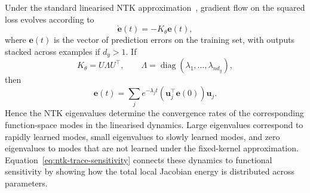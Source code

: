 \documentclass{article}
\theoremstyle{definition}
\theoremstyle{remark}
\begin{document}
Under the standard linearised NTK approximation~\cite{Jacot_2018, lee2019wide, chizat2019lazy}, gradient flow on the squared loss evolves according to
\begin{equation}
    \dot{\mathbf e}(t)
    =
    -
    K_\theta
    \mathbf e(t),
\end{equation}
where \(\mathbf e(t)\) is the vector of prediction errors on the training set, with outputs stacked across examples if \(d_y>1\). If
\begin{equation}
    K_\theta
    =
    U\Lambda U^\top,
    \qquad
    \Lambda
    =
    \operatorname{diag}(\lambda_1,\ldots,\lambda_{nd_y}),
\end{equation}
then
\begin{equation}
    \mathbf e(t)
    =
    \sum_j
    e^{-\lambda_j t}
    \left(\mathbf u_j^\top \mathbf e(0)\right)
    \mathbf u_j.
\end{equation}
Hence the NTK eigenvalues determine the convergence rates of the corresponding function-space modes in the linearised dynamics. Large eigenvalues correspond to rapidly learned modes, small eigenvalues to slowly learned modes, and zero eigenvalues to modes that are not learned under the fixed-kernel approximation. Equation~\eqref{eq:ntk-trace-sensitivity} connects these dynamics to functional sensitivity by showing how the total local Jacobian energy is distributed across parameters.
\end{document}
